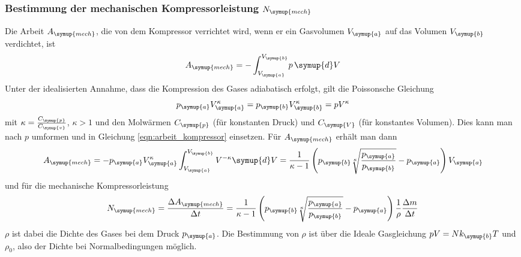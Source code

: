   \subsubsection{Bestimmung der mechanischen Kompressorleistung $N_\symup{mech}$}
  Die Arbeit $A_\symup{mech}$, die von dem Kompressor verrichtet wird, wenn er ein
  Gasvolumen $V_\symup{a}$ auf das Volumen $V_\symup{b}$ verdichtet, ist
  \begin{equation}
    A_\symup{mech} = - \int_{V_\symup{a}}^{V_\symup{b}} \!p \,\symup{d}V
    \label{eqn:arbeit_kompressor}
  \end{equation}
  Unter der idealisierten Annahme, dass die Kompression des Gases adiabatisch erfolgt,
  gilt die Poissonsche Gleichung
  \begin{equation}
    p_\symup{a} V_\symup{a}^\kappa = p_\symup{b} V_\symup{b}^\kappa = p V^\kappa
    \label{eqn:poissongl}
  \end{equation}
  mit $\kappa = \frac{C_\symup{p}}{C_\symup{v}}$, $\kappa > 1$ und den Molwärmen
  $C_\symup{p}$ (für konstanten Druck) und $C_\symup{V}$ (für konstantes Volumen).
  Dies kann man nach $p$ umformen und in Gleichung \eqref{eqn:arbeit_kompressor}
  einsetzen. Für $A_\symup{mech}$ erhält man dann
  \begin{equation}
    A_\symup{mech} = - p_\symup{a} V_\symup{a}^\kappa
    \int_{V_\symup{a}}^{V_\symup{b}} V^{-\kappa} \symup{d}V
    = \frac{1}{\kappa - 1}\left(p_\symup{b} \sqrt[\kappa]{\frac{p_\symup{a}}{p_\symup{b}}}
    - p_\symup{a} \right) V_\symup{a}
    \label{eqn:arbeit2}
  \end{equation}
  und für die mechanische Kompressorleistung
 \begin{equation}
   N_\symup{mech} = \frac{\Delta A_\symup{mech}}{\Delta t}
   = \frac {1}{\kappa - 1}\left(p_\symup{b} \sqrt[\kappa]{\frac{p_\symup{a}}{p_\symup{b}}}
   - p_\symup{a} \right) \frac{1}{\rho} \frac{\Delta m}{\Delta t}
   \label{eqn:kompressorleistung}
 \end{equation}
 $\rho$ ist dabei die Dichte des Gases bei dem Druck $p_\symup{a}$. Die Bestimmung
 von $\rho$ ist über die Ideale Gasgleichung $pV=Nk_\symup{b}T$ und $\rho_0$, also
 der Dichte bei Normalbedingungen möglich.
\cite{sample}
